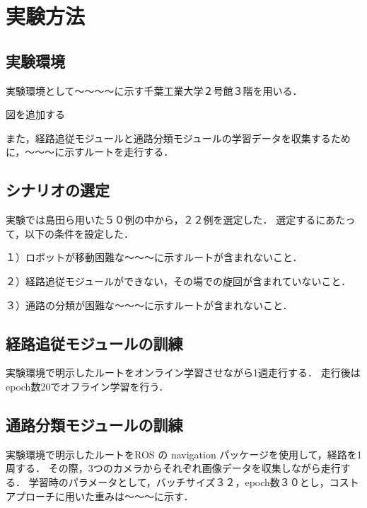 \section{実験方法}
\subsection{実験環境}
実験環境として～～～～に示す千葉工業大学２号館３階を用いる．

図を追加する

また，経路追従モジュールと通路分類モジュールの学習データを収集するために，～～～に示すルートを走行する．

\subsection{シナリオの選定}
実験では島田ら用いた５０例の中から，２２例を選定した．
選定するにあたって，以下の条件を設定した．

１）ロボットが移動困難な～～～に示すルートが含まれないこと．

２）経路追従モジュールができない，その場での旋回が含まれていないこと．

３）通路の分類が困難な～～～に示すルートが含まれないこと．

\subsection{経路追従モジュールの訓練}
実験環境で明示したルートをオンライン学習させながら1週走行する．
走行後はepoch数20でオフライン学習を行う．

\subsection{通路分類モジュールの訓練}
実験環境で明示したルートをROS の navigation パッケージを使用して，経路を1周する．
その際，3つのカメラからそれぞれ画像データを収集しながら走行する．
学習時のパラメータとして，バッチサイズ３２，epoch数３０とし，コストアプローチに用いた重みは～～～に示す．